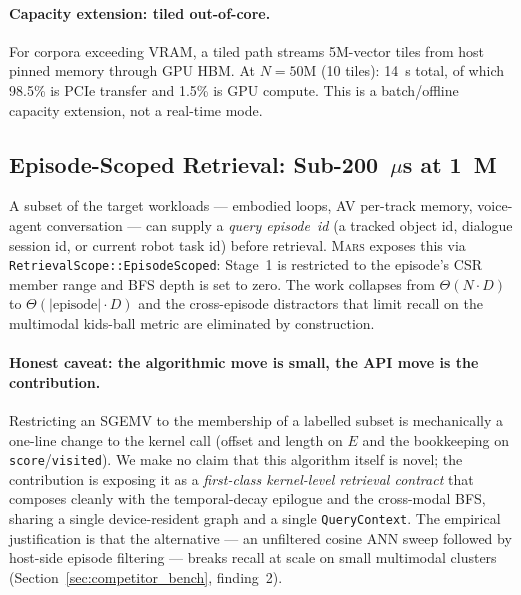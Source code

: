 \documentclass[11pt]{article}
\newcommand{\mars}{\textsc{Mars}}
\begin{document}
\paragraph{Capacity extension: tiled out-of-core.}
\label{sec:tiled}
For corpora exceeding VRAM, a tiled path streams 5M-vector tiles from
host pinned memory through GPU HBM. At $N{=}50$M (10 tiles): 14~s
total, of which 98.5\% is PCIe transfer and 1.5\% is GPU compute.
This is a batch/offline capacity extension, not a real-time mode.

\subsection{Episode-Scoped Retrieval: Sub-200~$\mu$s at 1~M}
\label{sec:episode_scoped}

A subset of the target workloads --- embodied loops, AV per-track
memory, voice-agent conversation --- can supply a \emph{query
episode~id} (a tracked object id, dialogue session id, or current
robot task id) before retrieval. \mars{} exposes this via
\texttt{RetrievalScope::EpisodeScoped}: Stage~1 is restricted to the
episode's CSR member range and BFS depth is set to zero. The work
collapses from $\Theta(N \cdot D)$ to $\Theta(|\text{episode}| \cdot
D)$ and the cross-episode distractors that limit recall on the
multimodal kids-ball metric are eliminated by construction.

\paragraph{Honest caveat: the algorithmic move is small, the API
move is the contribution.} Restricting an SGEMV to the membership
of a labelled subset is mechanically a one-line change to the
kernel call (offset and length on $E$ and the bookkeeping on
\texttt{score}/\texttt{visited}). We make no claim that this
algorithm itself is novel; the contribution is exposing it as a
\emph{first-class kernel-level retrieval contract} that composes
cleanly with the temporal-decay epilogue and the cross-modal BFS,
sharing a single device-resident graph and a single
\texttt{QueryContext}. The empirical justification is that the
alternative --- an unfiltered cosine ANN sweep followed by host-side
episode filtering --- breaks recall at scale on small multimodal
clusters (Section~\ref{sec:competitor_bench}, finding~2).
\end{document}
